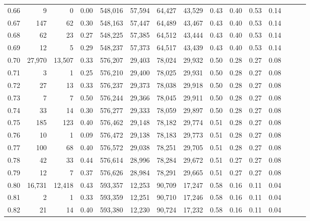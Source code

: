 \begin{tabular}{rrrrrrrrrrrrrrr}
0.66 &       9 &       0 &  0.00 &  548,016 &   57,594 &   64,427 &   43,529 &  0.43 &  0.40 &  0.53 &      0.14 \\
0.67 &     147 &      62 &  0.30 &  548,163 &   57,447 &   64,489 &   43,467 &  0.43 &  0.40 &  0.53 &      0.14 \\
0.68 &      62 &      23 &  0.27 &  548,225 &   57,385 &   64,512 &   43,444 &  0.43 &  0.40 &  0.53 &      0.14 \\
0.69 &      12 &       5 &  0.29 &  548,237 &   57,373 &   64,517 &   43,439 &  0.43 &  0.40 &  0.53 &      0.14 \\
0.70 &  27,970 &  13,507 &  0.33 &  576,207 &   29,403 &   78,024 &   29,932 &  0.50 &  0.28 &  0.27 &      0.08 \\
0.71 &       3 &       1 &  0.25 &  576,210 &   29,400 &   78,025 &   29,931 &  0.50 &  0.28 &  0.27 &      0.08 \\
0.72 &      27 &      13 &  0.33 &  576,237 &   29,373 &   78,038 &   29,918 &  0.50 &  0.28 &  0.27 &      0.08 \\
0.73 &       7 &       7 &  0.50 &  576,244 &   29,366 &   78,045 &   29,911 &  0.50 &  0.28 &  0.27 &      0.08 \\
0.74 &      33 &      14 &  0.30 &  576,277 &   29,333 &   78,059 &   29,897 &  0.50 &  0.28 &  0.27 &      0.08 \\
0.75 &     185 &     123 &  0.40 &  576,462 &   29,148 &   78,182 &   29,774 &  0.51 &  0.28 &  0.27 &      0.08 \\
0.76 &      10 &       1 &  0.09 &  576,472 &   29,138 &   78,183 &   29,773 &  0.51 &  0.28 &  0.27 &      0.08 \\
0.77 &     100 &      68 &  0.40 &  576,572 &   29,038 &   78,251 &   29,705 &  0.51 &  0.28 &  0.27 &      0.08 \\
0.78 &      42 &      33 &  0.44 &  576,614 &   28,996 &   78,284 &   29,672 &  0.51 &  0.27 &  0.27 &      0.08 \\
0.79 &      12 &       7 &  0.37 &  576,626 &   28,984 &   78,291 &   29,665 &  0.51 &  0.27 &  0.27 &      0.08 \\
0.80 &  16,731 &  12,418 &  0.43 &  593,357 &   12,253 &   90,709 &   17,247 &  0.58 &  0.16 &  0.11 &      0.04 \\
0.81 &       2 &       1 &  0.33 &  593,359 &   12,251 &   90,710 &   17,246 &  0.58 &  0.16 &  0.11 &      0.04 \\
0.82 &      21 &      14 &  0.40 &  593,380 &   12,230 &   90,724 &   17,232 &  0.58 &  0.16 &  0.11 &      0.04 \\

\end{tabular}
